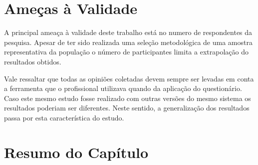 \section{Ameças à Validade}
\label{sec:pesquisa_profissionais_ameacas_validade}

A principal ameaça à validade deste trabalho está no numero de respondentes da
pesquisa. Apesar de ter sido realizada uma seleção metodológica de uma amostra
representativa da população o número de participantes limita a extrapolação do
resultados obtidos.

Vale ressaltar que todas as opiniões coletadas devem sempre ser levadas em conta
a ferramenta que o profissional utilizava quando da aplicação do questionário.
Caso este mesmo estudo fosse realizado com outras versões do mesmo sistema os
resultados poderiam ser diferentes. Neste sentido, a generalização dos
resultados passa por esta característica do estudo.

\section{Resumo do Capítulo}
\label{sec:resumo_do_capitulo}
